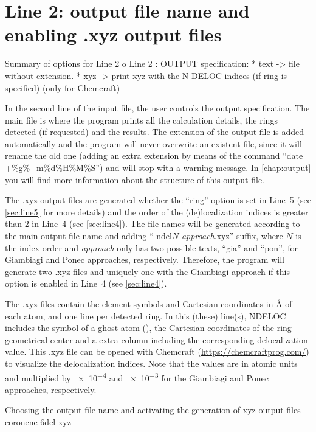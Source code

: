 \documentclass[a4paper,11pt,openany]{memoir}
\newcommand\programa{\textsc{NDELOC}}
\begin{document}
\section{Line 2: output file name and enabling .xyz output files}\label{sec:line2}
\begin{recuadro}{Summary of options for Line 2}
o Line 2 :  OUTPUT          specification:
 *  text   -> file without extension.
 *  xyz    -> print xyz with the N-DELOC indices (if ring is specified)
                        (only for Chemcraft)
\end{recuadro}
In the second line of the input file, the user controls the output specification. The main file is where the program prints all the calculation details, the rings detected (if requested) and the results. The extension of the output file is added automatically and the program will never overwrite an existent file, since it will rename the old one (adding an extra extension by means of the command ``date +\%g\%+m\%d\%H\%M\%S'') and will stop with a warning message. In \autoref{chap:output} you will find more information about the structure of this output file.

The .xyz output files are generated whether the ``ring'' option is set in Line~5 (see \autoref{sec:line5} for more details) and the order of the (de)localization indices is greater than \num{2} in Line~4 (see \autoref{sec:line4}). The file names will be generated according to the main output file name and adding ``-ndel$N$-\emph{approach}.xyz'' suffix, where $N$ is the index order and \emph{approach} only has two possible texts, ``gia'' and ``pon'', for Giambiagi and Ponec approaches, respectively. Therefore, the program will generate two .xyz files and uniquely one with the Giambiagi approach if this option is enabled in Line~4 (see \autoref{sec:line4}).

The .xyz files contain the element symbols and Cartesian coordinates in \si{\angstrom} of each atom, and one line per detected ring. In this (these) line(s), \programa~ includes the symbol of a ghost atom (), the Cartesian coordinates of the ring geometrical center and a extra column including the corresponding delocalization value. This .xyz file can be opened with Chemcraft (\url{https://chemcraftprog.com/}) to visualize the delocalization indices. Note that the values are in atomic units and multiplied by \num{e-4} and \num{e-3} for the Giambiagi and Ponec approaches, respectively.
\begin{myexample}{Choosing the output file name and activating the generation of xyz output files}
	coronene-6del xyz
\end{myexample}
\end{document}
